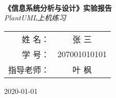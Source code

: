 \begin{titlepage}
    \centering
    \logo \\
    \Huge\textbf{《信息系统分析与设计》实验报告}\\
    \vspace{10pt}
    \Large\textit{PlantUML上机练习}\\
    \vspace{160pt}
    \begin{tabular}{rc}
        \large 姓 \hspace{19pt} 名： & \large 张 \hspace{12pt} 三 \\
        \large 学 \hspace{19pt} 号： & \large 207001010101 \\
        \large 指导老师： & \large 叶 \hspace{12pt} 枫 \\
    \end{tabular}
    \vfill
    \Large 2020-01-01
\end{titlepage}